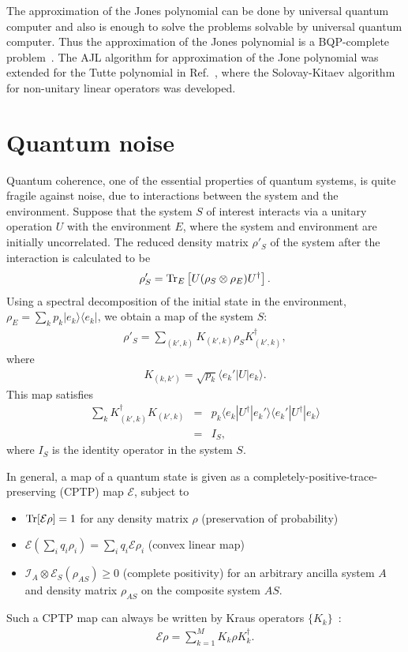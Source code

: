 The approximation of the Jones polynomial 
can be done by universal quantum computer
and also is enough to solve the problems solvable by 
universal quantum computer. 
Thus the approximation of the Jones polynomial is a 
BQP-complete problem~\cite{AharonovJones,AharonovJonesHard}.
The AJL algorithm for approximation of the Jone polynomial 
was extended for the Tutte polynomial in Ref.~\cite{AharonovTutte},
where the Solovay-Kitaev algorithm for non-unitary linear operators 
was developed.


\section{Quantum noise}
Quantum coherence, one of the essential properties of quantum systems, is quite fragile against noise, due to interactions between the system and the environment.
Suppose that the system $S$ of interest interacts via a unitary operation $U$ with the environment $E$, where the system and environment are initially uncorrelated. 
The reduced density matrix $\rho' _S$ of the system after the interaction is calculated to be
\begin{eqnarray}
\rho' _S   = {\rm Tr}_{E} 
\left[U (\rho_{S} \otimes \rho _{E})U^{\dag} \right].
\end{eqnarray}
Using a spectral decomposition of the initial state in the environment, $\rho _{E} = \sum _{k} p_k |e_k \rangle \langle e_k |$, we obtain a map of the system $S$:
\begin{eqnarray}
\rho'_S = \sum _{(k',k)} K_{(k',k)} \rho _S K_{(k',k)}^{\dag},
\end{eqnarray}
where 
\begin{eqnarray}
K_{(k,k')} = \sqrt{p_k}\langle e_k' | U |e_k \rangle.
\end{eqnarray}
This map satisfies 
\begin{eqnarray}
\sum _{k}K_{(k',k)}^{\dag} K_{(k',k)} &=& 
p_k \langle e_k | U^{\dag} |e_k' \rangle 
\langle e_k' | U^{\dag} |e_k \rangle
\nonumber \\
&=& I_S,
\end{eqnarray}
where $I_S$ is the identity operator in the system $S$.

In general, a map of a quantum state is given as a completely-positive-trace-preserving (CPTP)  map $\mathcal{E}$, subject to
\begin{itemize}
	\item ${\rm Tr} [\mathcal{E}  \rho ] =1$ for any density matrix $\rho$ (preservation of probability)
	\item $\mathcal{E}(\sum _{i} q_i \rho _i ) = \sum _i q_i \mathcal{E}\rho_i$ (convex linear map)
	\item $\mathcal{I}_{A} \otimes \mathcal{E}_S (\rho_{AS}) \geq 0$ (complete positivity) for an arbitrary ancilla system $A$ and density matrix $\rho _{AS}$ on the composite system $AS$.
\end{itemize}
Such a CPTP map can always be written by Kraus operators $\{ K_k\}$~\cite{NielsenChuang}:
\begin{eqnarray}
\mathcal{E} \rho = \sum _{k=1}^{M} K_{k} \rho K_{k}^{\dag}.
\end{eqnarray}

